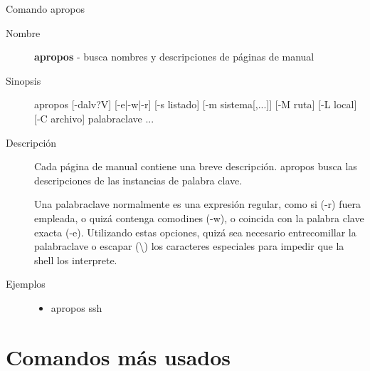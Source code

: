 \begin{frame}[c]{Comando apropos}
  \begin{description}
    \item[Nombre]
      \textbf{apropos} - busca nombres y descripciones de páginas de manual

    \vspace{\baselineskip}
    \item[Sinopsis]
      apropos [-dalv?V] [-e|-w|-r] [-s listado] [-m sistema[,...]] [-M ruta] [-L local] [-C archivo] palabraclave ...

    \vspace{\baselineskip}
    \item[Descripción]
      Cada página de manual contiene una breve descripción.
      apropos busca las descripciones de las instancias de palabra clave.

      Una palabraclave normalmente es una expresión regular, como si (-r)
      fuera empleada, o quizá contenga comodines (-w), o coincida con la
      palabra clave exacta (-e). Utilizando estas opciones, quizá sea
      necesario entrecomillar la palabraclave o escapar (\textbackslash{})
      los caracteres especiales para impedir que la shell los interprete.

    \vspace{\baselineskip}
    \item[Ejemplos]
      \begin{itemize}
        \item apropos ssh
      \end{itemize}
  \end{description}
\end{frame}

\section{Comandos más usados}

